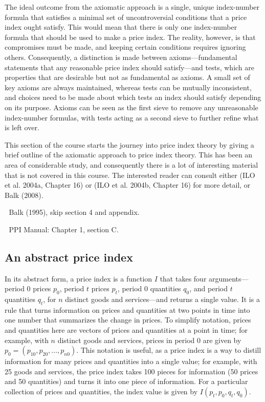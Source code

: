 \documentclass[]{article}
\begin{document}
The ideal outcome from the axiomatic approach is a single, unique index-number formula that satisfies a minimal set of uncontroversial conditions that a price index ought satisfy. This would mean that there is only one index-number formula that should be used to make a price index. The reality, however, is that compromises must be made, and keeping certain conditions requires ignoring others. Consequently, a distinction is made between axioms---fundamental statements that any reasonable price index should satisfy---and tests, which are properties that are desirable but not as fundamental as axioms. A small set of key axioms are always maintained, whereas tests can be mutually inconsistent, and choices need to be made about which tests an index should satisfy depending on its purpose. Axioms can be seen as the first sieve to remove any unreasonable index-number formulas, with tests acting as a second sieve to further refine what is left over.

This section of the course starts the journey into price index theory by giving a brief outline of the axiomatic approach to price index theory. This has been an area of considerable study, and consequently there is a lot of interesting material that is not covered in this course. The interested reader can consult either (ILO et al. 2004a, Chapter 16) or (ILO et al. 2004b, Chapter 16) for more detail, or Balk (2008).

📖 Balk (1995), skip section 4 and appendix.

📖 PPI Manual: Chapter 1, section C.

\hypertarget{an-abstract-price-index}{%
\subsection{An abstract price index}\label{an-abstract-price-index}}

In its abstract form, a price index is a function \(I\) that takes four arguments---period 0 prices \(p_{0}\), period \(t\) prices \(p_{t}\), period 0 quantities \(q_{0}\), and period \(t\) quantities \(q_{t}\), for \(n\) distinct goods and services---and returns a single value. It is a rule that turns information on prices and quantities at two points in time into one number that summarizes the change in prices. To simplify notation, prices and quantities here are vectors of prices and quantities at a point in time; for example, with \(n\) distinct goods and services, prices in period 0 are given by \(p_0 = (p_{10}, p_{20}, \ldots, p_{n0})\). This notation is useful, as a price index is a way to distill information for many prices and quantities into a single value; for example, with 25 goods and services, the price index takes 100 pieces for information (50 prices and 50 quantities) and turns it into one piece of information. For a particular collection of prices and quantities, the index value is given by \(I(p_{t}, p_{0}, q_{t}, q_{0})\).
\end{document}
